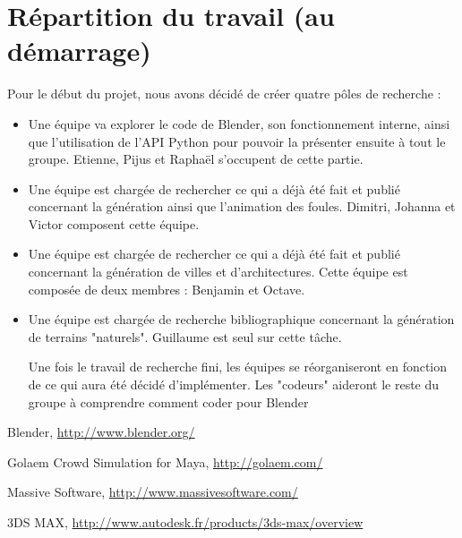 \documentclass[a4paper,12pt]{article}
\begin{document}
\section{Répartition du travail (au démarrage)}

Pour le début du projet, nous avons décidé de créer quatre pôles de recherche :
\begin{itemize}
\item Une équipe va explorer le code de Blender, son fonctionnement interne, ainsi que l'utilisation de l'API Python pour pouvoir la présenter ensuite à tout le groupe. Etienne, Pijus et Raphaël s'occupent de cette partie. 
\item Une équipe est chargée de rechercher ce qui a déjà été fait et publié concernant la génération ainsi que l'animation des foules. Dimitri, Johanna et Victor composent cette équipe.
\item Une équipe est chargée de rechercher ce qui a déjà été fait et publié concernant la génération de villes et d'architectures. Cette équipe est composée de deux membres : Benjamin et Octave.
\item Une équipe est chargée de recherche bibliographique concernant la génération de terrains "naturels". Guillaume est seul sur cette tâche.

Une fois le travail de recherche fini, les équipes se réorganiseront en fonction de ce qui aura été décidé d'implémenter. Les "codeurs" aideront le reste du groupe à comprendre comment coder pour Blender
\end{itemize}

\newpage

\begin{thebibliography}{}

  Blender,
  \url{http://www.blender.org/}


  Golaem Crowd Simulation for Maya,
  \url{http://golaem.com/}


  Massive Software,
  \url{http://www.massivesoftware.com/}


  3DS MAX,
  \url{http://www.autodesk.fr/products/3ds-max/overview}

\end{thebibliography}
\end{document}

